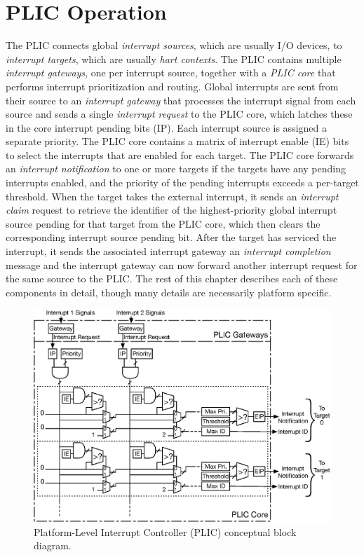 \section{PLIC Operation}

The PLIC connects global \emph{interrupt sources}, which are usually
I/O devices, to \emph{interrupt targets}, which are usually \emph{hart
  contexts}.  The PLIC contains multiple \emph{interrupt gateways}, one
per interrupt source, together with a \emph{PLIC core} that performs
interrupt prioritization and routing.  Global interrupts are sent from
their source to an \emph{interrupt gateway} that processes the
interrupt signal from each source and sends a single \emph{interrupt
  request} to the PLIC core, which latches these in the core interrupt
pending bits (IP).  Each interrupt source is assigned a separate
priority.  The PLIC core contains a matrix of interrupt enable (IE)
bits to select the interrupts that are enabled for each target.  The
PLIC core forwards an \emph{interrupt notification} to one or more
targets if the targets have any pending interrupts enabled, and the
priority of the pending interrupts exceeds a per-target threshold.
When the target takes the external interrupt, it sends an \emph{
  interrupt claim} request to retrieve the identifier of the
highest-priority global interrupt source pending for that target from
the PLIC core, which then clears the corresponding interrupt source
pending bit.  After the target has serviced the interrupt, it sends
the associated interrupt gateway an \emph{interrupt completion} message
and the interrupt gateway can now forward another interrupt request
for the same source to the PLIC.  The rest of this chapter describes
each of these components in detail, though many details are
necessarily platform specific. 

\begin{figure}[tb]
\centering
\includegraphics[width=\textwidth]{assets/img/PLIC-block-diagram}
\caption{Platform-Level Interrupt Controller (PLIC) conceptual block diagram.}
\label{fig:plic-block-diagram}
\end{figure}

